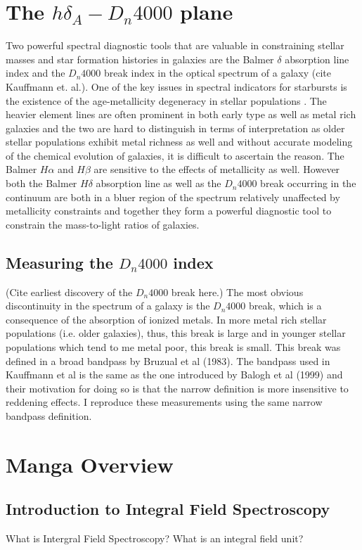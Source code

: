 \section{The $h\delta_{A}-D_{n}4000$ plane}

Two powerful spectral diagnostic tools that are valuable in constraining stellar masses and star formation histories in galaxies are the Balmer $\delta$ absorption line index and the $D_{n}4000$ break index in the optical spectrum of a galaxy (cite Kauffmann et. al.). One of the key issues in spectral indicators for starbursts is the existence of the age-metallicity degeneracy in stellar populations \citep{worthey_comprehensive_1994}. The heavier element lines are often prominent in both early type as well as metal rich galaxies and the two are hard to distinguish in terms of interpretation as older stellar populations exhibit metal richness as well and without accurate modeling of the chemical evolution of galaxies, it is difficult to ascertain the reason. The Balmer $H\alpha$ and $H\beta$ are sensitive to the effects of metallicity as well. However both the Balmer $H\delta$ absorption line as well as the $D_{n}4000$ break occurring in the continuum are both in a bluer region of the spectrum relatively unaffected by metallicity constraints and together they form a powerful diagnostic tool to constrain the mass-to-light ratios of galaxies. 

\subsection{Measuring the $D_{n}4000$ index}
(Cite earliest discovery of the $D_{n}4000$ break here.)  The most obvious discontinuity in the spectrum of a galaxy is the $D_{n}4000$ break, which is a consequence of the absorption of ionized metals. In more metal rich stellar populations (i.e. older galaxies), thus, this break is large and in younger stellar populations which tend to me metal poor, this break is small. This break was defined in a broad bandpass by Bruzual et al (1983). The bandpass used in Kauffmann et al is the same as the one introduced by Balogh et al (1999) and their motivation for doing so is that the narrow definition is more insensitive to reddening effects. I reproduce these measurements using the same narrow bandpass definition.


\section{Manga Overview}
\subsection{Introduction to Integral Field Spectroscopy}
What is Intergral Field Spectroscopy? What is an integral field unit?

